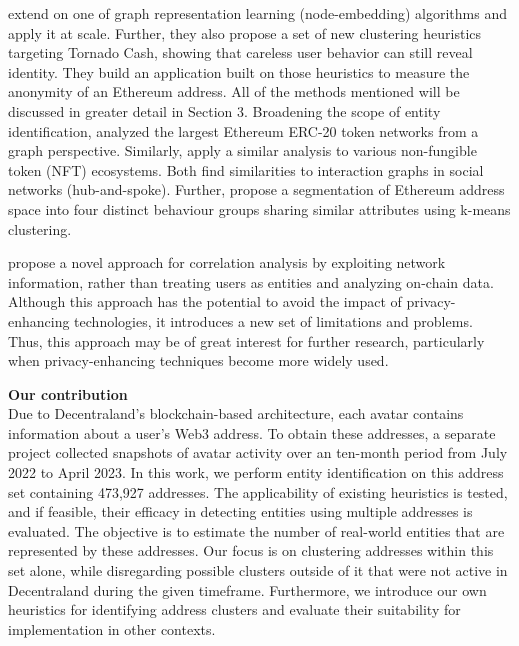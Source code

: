 \documentclass[12pt,a4paper,titlepage,oneside,english]{article}
\begin{document}
\cite{wu2022tutela} extend on one of \cite{Beres2020} graph representation learning (node-embedding) algorithms and apply it at scale. Further, they also propose a set of new clustering heuristics targeting Tornado Cash, showing that careless user behavior can still reveal identity. They build an application built on those heuristics to measure the anonymity of an Ethereum address. \newline
All of the methods mentioned will be discussed in greater detail in Section 3. \newline
Broadening the scope of entity identification, \cite{victorlüders2019} analyzed the largest Ethereum ERC-20 token networks from a graph perspective. Similarly, \cite{casalebrunet2021} apply a similar analysis to various non-fungible token (NFT) ecosystems. Both find similarities to interaction graphs in social networks (hub-and-spoke). Further, \cite{Payette2017} propose a segmentation of Ethereum address space into four distinct behaviour groups sharing similar attributes using k-means clustering. 

\cite{yu2023} propose a novel approach for correlation analysis by exploiting network information, rather than treating users as entities and analyzing on-chain data. Although this approach has the potential to avoid the impact of privacy-enhancing technologies, it introduces a new set of limitations and problems. Thus, this approach may be of great interest for further research, particularly when privacy-enhancing techniques become more widely used.


\textbf{Our contribution}\\
Due to Decentraland's blockchain-based architecture, each avatar contains information about a user's Web3 address. 
To obtain these addresses, a separate project collected snapshots of avatar activity over an ten-month period from July 2022 to April 2023. 
In this work, we perform entity identification on this address set containing 473,927 addresses. 
The applicability of existing heuristics is tested, and if feasible, their efficacy in detecting entities using multiple addresses is evaluated. 
The objective is to estimate the number of real-world entities that are represented by these addresses. Our focus is on clustering addresses within this set alone, while disregarding possible clusters outside of it that were not active in Decentraland during the given timeframe. 
Furthermore, we introduce our own heuristics for identifying address clusters and evaluate their suitability for implementation in other contexts.
\end{document}
